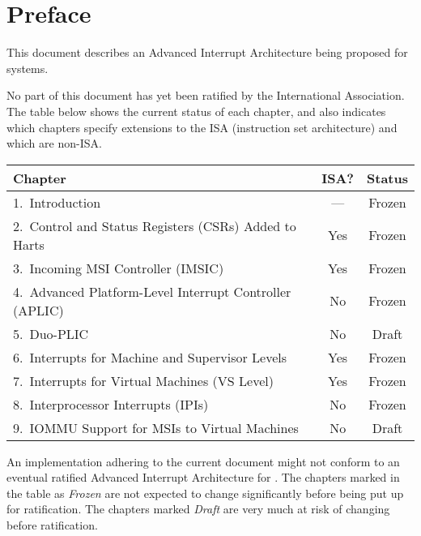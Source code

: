 
\chapter{Preface}

This document describes an Advanced Interrupt Architecture
being proposed for {\RISCV} systems.

No part of this document has yet been ratified
by the {\RISCV} International Association.
The table below shows the current status of each chapter,
and also indicates which chapters specify extensions to the
{\RISCV} ISA (instruction set architecture) and which are non-ISA.

{
\begin{table}[hbt]
\centering
\begin{tabular}{|l|c|c|}
\hline
Chapter                                                  & ISA? & Status \\
\hline
\hline
1.\ Introduction                                         & ---  & Frozen \\
2.\ Control and Status Registers (CSRs) Added to Harts   & Yes  & Frozen \\
3.\ Incoming MSI Controller (IMSIC)                      & Yes  & Frozen \\
4.\ Advanced Platform-Level Interrupt Controller (APLIC) & No   & Frozen \\
5.\ Duo-PLIC                                             & No   & Draft \\
6.\ Interrupts for Machine and Supervisor Levels         & Yes  & Frozen \\
7.\ Interrupts for Virtual Machines (VS Level)           & Yes  & Frozen \\
8.\ Interprocessor Interrupts (IPIs)                     & No   & Frozen \\
9.\ IOMMU Support for MSIs to Virtual Machines           & No   & Draft \\
\hline
\end{tabular}
\end{table}
}

An implementation adhering to the current document might not conform
to an eventual ratified Advanced Interrupt Architecture for {\RISCV}.
The chapters marked in the table as \emph{Frozen} are not expected
to change significantly before being put up for ratification.
The chapters marked \emph{Draft} are very much
at risk of changing before ratification.

